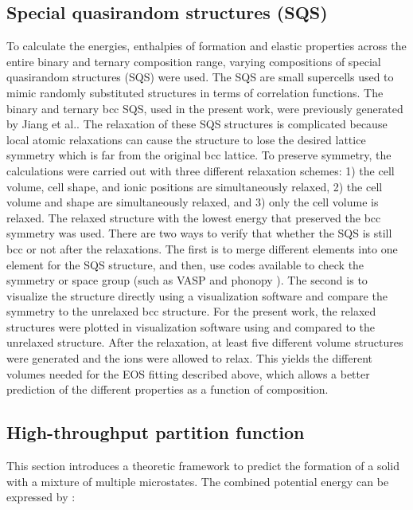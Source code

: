\subsection{Special quasirandom structures (SQS)}

To calculate the energies, enthalpies of formation and elastic properties across the entire binary and ternary composition range, varying compositions of special quasirandom structures (SQS) were used. The SQS are small supercells used to mimic randomly substituted structures in terms of correlation functions. The binary and ternary bcc SQS, used in the present work, were previously generated by Jiang et al.\cite{Jiang2004,Jiang2009}. The relaxation of these SQS structures is complicated because local atomic relaxations can cause the structure to lose the desired lattice symmetry which is far from the original bcc lattice. To preserve symmetry, the calculations were carried out with three different relaxation schemes: 1) the cell volume, cell shape, and ionic positions are simultaneously relaxed, 2) the cell volume and shape are simultaneously relaxed, and 3) only the cell volume is relaxed. The relaxed structure with the lowest energy that preserved the bcc symmetry was used. There are two ways to verify that whether the SQS is still bcc or not after the relaxations. The first is to merge different elements into one element for the SQS structure, and then, use codes available to check the symmetry or space group (such as VASP \cite{Kresse1999} and phonopy \cite{Togo2008}). The second is to visualize the structure directly using a visualization software and compare the symmetry to the unrelaxed bcc structure. For the present work, the relaxed structures were plotted in visualization software using and compared to the unrelaxed structure. After the relaxation, at least five different volume structures were generated and the ions were allowed to relax. This yields the different volumes needed for the EOS fitting described above, which allows a better prediction of the different properties as a function of composition. 

\subsection{High-throughput partition function}

This section introduces a theoretic framework to predict the formation of a solid with a mixture of multiple microstates. The combined potential energy can be expressed by \cite{Liu2016}:

